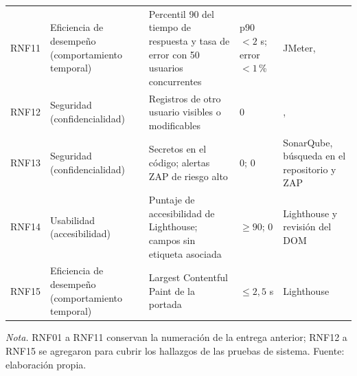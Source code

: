 {\begin{longtable}{L{1.35cm} L{2.6cm} L{3.7cm} L{2.3cm} L{3.55cm}}
RNF11 & Eficiencia de desempeño (comportamiento temporal) & Percentil 90 del tiempo de respuesta y tasa de error con 50 usuarios concurrentes & p90 $< 2$ s; error $< 1$\,\% & JMeter,  \\
RNF12 & Seguridad (confidencialidad) & Registros de otro usuario visibles o modificables & 0 & ,  \\
RNF13 & Seguridad (confidencialidad) & Secretos en el código; alertas ZAP de riesgo alto & 0; 0 & SonarQube, búsqueda en el repositorio y ZAP \\
RNF14 & Usabilidad (accesibilidad) & Puntaje de accesibilidad de Lighthouse; campos sin etiqueta asociada & $\geq 90$; 0 & Lighthouse y revisión del DOM \\
RNF15 & Eficiencia de desempeño (comportamiento temporal) & Largest Contentful Paint de la portada & $\leq 2{,}5$ s & Lighthouse \parencite{google2025vitals} \\
\end{longtable}
}
\vspace{-1em}
{\small\textit{Nota.} RNF01 a RNF11 conservan la numeración de la entrega anterior; RNF12 a RNF15 se agregaron para cubrir los hallazgos de las pruebas de sistema. Fuente: elaboración propia.}
